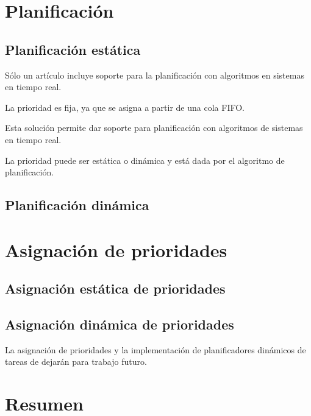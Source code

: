 \section{Planificación} 

\subsection{Planificación estática}

Sólo un artículo incluye soporte para la planificación con algoritmos en sistemas en tiempo real.

La prioridad es fija, ya que se asigna a partir de una cola FIFO.

Esta solución permite dar soporte para planificación con algoritmos de sistemas en tiempo real.

La prioridad puede ser estática o dinámica y está dada por el algoritmo de planificación.

\subsection{Planificación dinámica}
\section{Asignación de prioridades }

\subsection{Asignación estática de prioridades }

\subsection{Asignación dinámica de prioridades }
	La asignación de prioridades y la implementación de planificadores dinámicos de tareas de dejarán para trabajo futuro.
\section{Resumen}




